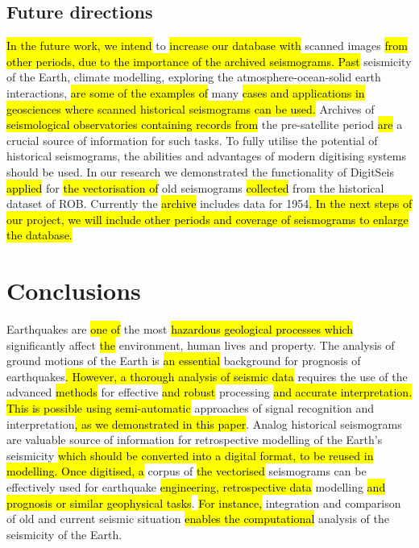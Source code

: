 \documentclass[sensors,article,submit,moreauthors,pdftex]{Definitions/mdpi}
\begin{document}
\subsection{Future directions}
\hl{In the future work, we intend }to \hl{increase our database with} scanned images\hl{ from other periods, due to the importance of the archived seismograms. Past }seismicity of the Earth, climate modelling, exploring the atmosphere-ocean-solid earth interactions, \hl{are some of the examples of} many \hl{cases and applications in geosciences where scanned historical seismograms can be used. }Archives of \hl{seismological observatories containing records from }the pre-satellite period \hl{are }a crucial source of information for such tasks. To fully utilise the potential of historical seismograms, the abilities and advantages of modern digitising systems should be used. In our research we demonstrated the functionality of DigitSeis \hl{applied }for \hl{the vectorisation of }old seismograms \hl{collected }from the historical dataset of \ac{ROB}. Currently the \hl{archive }includes data for 1954\hl{. In the next steps of our project, we will include other periods and coverage of seismograms to enlarge the database.} 

\section{Conclusions}

Earthquakes are \hl{one of }the most \hl{hazardous geological processes which }significantly affect\hl{ the }environment, human\hl{ }lives and property. The analysis of ground motions of the Earth is \hl{an essential }background for prognosis of earthquakes\hl{. However, a thorough analysis of seismic data }requires the use of the advanced \hl{methods }for effective \hl{and robust }processing\hl{ and accurate interpretation. This is possible using semi-automatic }approaches of signal recognition and interpretation\hl{, as we demonstrated in this paper}. Analog historical seismograms are valuable source of information for retrospective modelling of the Earth's seismicity\hl{ which should be converted into a digital format, to be reused in modelling. Once digitised, a} corpus of \hl{the vectorised }seismograms can be effectively used\hl{ }for earthquake \hl{engineering, retrospective data }modelling \hl{and prognosis or similar geophysical tasks}. \hl{For instance, }integration and comparison of old and current seismic situation\hl{ enables the computational }analysis of the seismicity of the Earth.  
\end{document}
